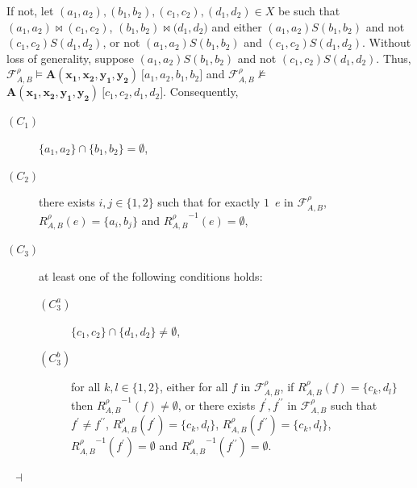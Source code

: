\documentclass[draft]{article}
\newenvironment{proof}{{\bf Proof:}}{~$\dashv$\\}
\begin{document}
\begin{proof}
If not, let $(a_{1},a_{2}),(b_{1},b_{2}),(c_{1},c_{2}),(d_{1},d_{2}){\in}X$ be such that $(a_{1},a_{2}){\bowtie}(c_{1},c_{2})$, $(b_{1},b_{2}){\bowtie}(d_{1},
%
%
%
%
%
%
%
%
%
%
%
%
$\linebreak$
%
%
%
%
%
%
%
%
%
%
%
%
d_{2})$ and either $(a_{1},a_{2}){S}(b_{1},b_{2})$ and not $(c_{1},c_{2}){S}(d_{1},d_{2})$, or not $(a_{1},a_{2}){S}(b_{1},b_{2})$ and $(c_{1},c_{2}){S}(d_{1},d_{2})$.
Without loss of generality, suppose $(a_{1},a_{2}){S}(b_{1},b_{2})$ and not $(c_{1},c_{2}){S}(d_{1},d_{2})$.
Thus, ${\mathcal F}^{\rho}_{A,B}{\models}\mathbf{A}(\mathbf{x_{1}},\mathbf{x_{2}},\mathbf{y_{1}},\mathbf{y_{2}})\ \lbrack a_{1},a_{2},b_{1},b_{2}\rbrack$ and ${\mathcal F}^{\rho}_{A,B}{\not\models}
%
%
%
%
%
%
%
%
%
%
%
%
$\linebreak$
%
%
%
%
%
%
%
%
%
%
%
%
\mathbf{A}(\mathbf{x_{1}},\mathbf{x_{2}},\mathbf{y_{1}},\mathbf{y_{2}})\ \lbrack c_{1},c_{2},d_{1},d_{2}\rbrack$.
Consequently,
%
%
\begin{description}
%
%
\item[$(C_{1})$] $\{a_{1},a_{2}\}{\cap}\{b_{1},b_{2}\}{=}\emptyset$,
%
%
\item[$(C_{2})$] there exists $i,j{\in}\{1,2\}$ such that for exactly $1$~$e$ in ${\mathcal F}_{A,B}^{\rho}$, $R_{A,B}^{\rho}(e){=}\{a_{i},b_{j}\}$ and ${R_{A,B}^{\rho}}^{{-}1}(e){=}\emptyset$,
%
%
\item[$(C_{3})$] at least one of the following conditions holds:
%
%
\begin{description}
%
%
\item[$(C_{3}^{a})$] $\{c_{1},c_{2}\}{\cap}\{d_{1},d_{2}\}{\not=}\emptyset$,
%
%
\item[$(C_{3}^{b})$] for all $k,l{\in}\{1,2\}$, either for all $f$ in ${\mathcal F}_{A,B}^{\rho}$, if $R_{A,B}^{\rho}(f){=}\{c_{k},d_{l}\}$ then ${R_{A,B}^{\rho}}^{{-}1}(f){\not=}\emptyset$, or there exists $f^{\prime},f^{\prime\prime}$ in ${\mathcal F}_{A,B}^{\rho}$ such that $f^{\prime}{\not=}f^{\prime\prime}$,
%
%
%
%
%
%
%
%
%
%
%
%
\linebreak$
%
%
%
%
%
%
%
%
%
%
%
%
R_{A,B}^{\rho}(f^{\prime}){=}\{c_{k},d_{l}\}$, $R_{A,B}^{\rho}(f^{\prime\prime}){=}\{c_{k},d_{l}\}$, ${R_{A,B}^{\rho}}^{{-}1}(f^{\prime}){=}\emptyset$ and
%
%
%
%
%
%
%
%
%
%
%
%
\linebreak$
%
%
%
%
%
%
%
%
%
%
%
%
{R_{A,B}^{\rho}}^{{-}1}(f^{\prime\prime}){=}\emptyset$.
%
%
\end{description}
%
%
\end{description}
%
%

\end{proof}
\end{document}
